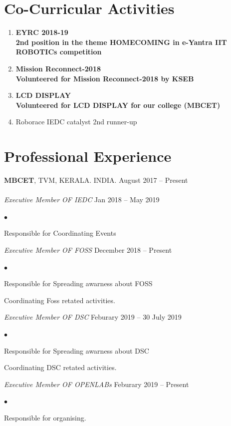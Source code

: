 \documentclass[margin,line]{res}
\newenvironment{list2}{
	\begin{list}{$\bullet$}{%
			\setlength{\itemsep}{0in}
			\setlength{\parsep}{0in} \setlength{\parskip}{0in}
			\setlength{\topsep}{0in} \setlength{\partopsep}{0in}
			\setlength{\leftmargin}{0.2in}}}{\end{list}}
\begin{document}
\begin{resume}
\section{\sc Co-Curricular Activities}
\begin{enumerate} %
	\item \bf EYRC 2018-19 \\
	2nd position in the theme HOMECOMING in e-Yantra IIT ROBOTICs competition \\
	\item \bf Mission Reconnect-2018\\
	Volunteered for Mission Reconnect-2018 by KSEB 
	\item \bf LCD DISPLAY   \\
	Volunteered for LCD DISPLAY for our college (MBCET)
	\item Roborace IEDC catalyst 2nd runner-up\\
	
\end{enumerate}
\section{\sc Professional Experience}
{\bf MBCET}, TVM, KERALA. INDIA. \hfill{August 2017 -- Present}\\
\\
{\em Executive Member  OF IEDC }\hfill {Jan 2018 -- May 2019}\\
\begin{list2} %
	\item Responsible for Coordinating Events  \\
\end{list2}
{\em Executive Member  OF FOSS }\hfill {December 2018 -- Present}\\
\begin{list2} %
	\item Responsible for Spreading awarness about FOSS  \\
	\item Coordinating Foss retated activities.
\end{list2}

{\em Executive Member  OF DSC }\hfill {Feburary 2019 -- 30 July 2019}\\
\begin{list2} %
	\item Responsible for Spreading awarness about DSC  \\
	\item Coordinating DSC retated activities.
\end{list2}
{\em Executive Member  OF OPENLABs }\hfill {Feburary 2019 -- Present}\\
\begin{list2} %
	\item Responsible for organising.   \\
	

\end{list2}
\end{resume}
\end{document}
